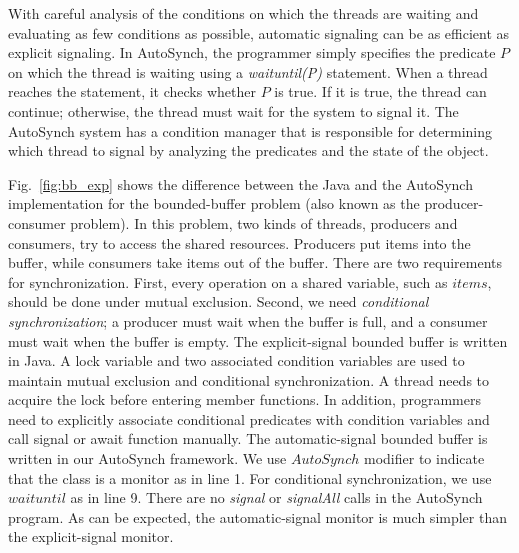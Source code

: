 \documentclass[preprint]{sigplanconf}
\begin{document}
 With careful analysis of the conditions on which
the threads are waiting and evaluating as few conditions as possible, automatic signaling can be as efficient 
as explicit signaling.
In AutoSynch, the programmer simply specifies the predicate $P$ on which the thread is 
waiting using a {\em waituntil(P)} statement. 
When a thread reaches the statement, it checks whether $P$ is true. If it is true, the thread can continue; 
otherwise, the thread must wait for the system to signal it. The AutoSynch system has a condition manager that is responsible for determining
which thread to signal by analyzing the predicates and the state of the object. 


Fig.~\ref{fig:bb_exp} shows the difference between 
the Java and the AutoSynch implementation for the 
bounded-buffer problem (also known as the producer-consumer problem). 
In this problem, two kinds of threads, producers and consumers, try to 
access  the shared resources. Producers put items 
into the buffer, while consumers take items out of the buffer. There are two requirements for synchronization.
First, every 
operation on a shared variable, such as $items$, should be done under mutual exclusion. Second, we need {\em conditional synchronization};
a producer must wait  
when the buffer is full, and a consumer must wait when the 
buffer is empty. The explicit-signal bounded buffer is written in Java. A 
lock variable and two associated condition variables are used to maintain mutual exclusion 
and conditional synchronization. A thread needs to acquire the lock before entering member
functions. In addition, programmers need to explicitly associate conditional 
predicates with condition variables and call signal or await function manually.
The automatic-signal bounded buffer is written in our AutoSynch framework.
We use $AutoSynch$ modifier to indicate that the class is a monitor as in line 
1. For conditional synchronization,  we use $waituntil$ as in line 9. There are no
{\em signal} or {\em signalAll} calls in the AutoSynch program.
As can be expected, the automatic-signal monitor is
much simpler than the explicit-signal monitor. 
\end{document}
